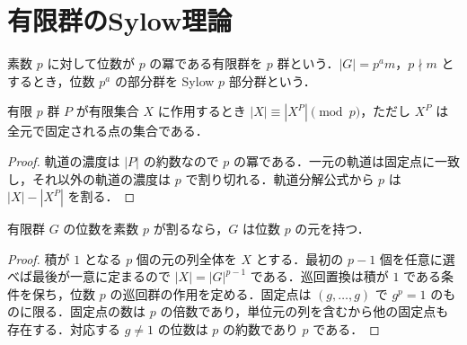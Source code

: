 \section{有限群のSylow理論}
\begin{defn}[p群とSylow部分群]
素数 $p$ に対して位数が $p$ の冪である有限群を $p$ 群という．$|G|=p^a m$，$p\nmid m$ とするとき，位数 $p^a$ の部分群を Sylow $p$ 部分群という．
\end{defn}
\begin{prop}[p群の作用と固定点の合同]
有限 $p$ 群 $P$ が有限集合 $X$ に作用するとき $|X|\equiv |X^P|\pmod p$，ただし $X^P$ は全元で固定される点の集合である．
\end{prop}
\begin{proof}
軌道の濃度は $|P|$ の約数なので $p$ の冪である．一元の軌道は固定点に一致し，それ以外の軌道の濃度は $p$ で割り切れる．軌道分解公式から $p$ は $|X|-|X^P|$ を割る．
\end{proof}
\begin{prop}[Cauchyの定理]
有限群 $G$ の位数を素数 $p$ が割るなら，$G$ は位数 $p$ の元を持つ．
\end{prop}
\begin{proof}
積が $1$ となる $p$ 個の元の列全体を $X$ とする．最初の $p-1$ 個を任意に選べば最後が一意に定まるので $|X|=|G|^{p-1}$ である．巡回置換は積が $1$ である条件を保ち，位数 $p$ の巡回群の作用を定める．固定点は $(g,\ldots,g)$ で $g^p=1$ のものに限る．固定点の数は $p$ の倍数であり，単位元の列を含むから他の固定点も存在する．対応する $g\ne1$ の位数は $p$ の約数であり $p$ である．
\end{proof}
